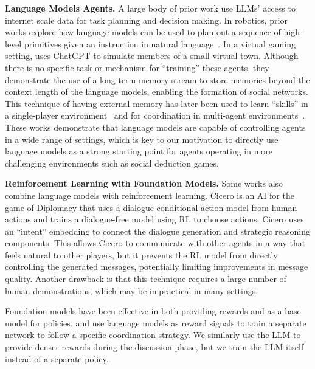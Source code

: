 \noindent \textbf{Language Models Agents.} A large body of prior work use LLMs' access to internet scale data for task planning and decision making. In robotics, prior works explore how language models can be used to plan out a sequence of high-level primitives given an instruction in natural language~\cite{saycan2022arxiv, huang22a, Lin2023}. %
In a virtual gaming setting, \citet{Park2023GenerativeAgents} uses ChatGPT to simulate members of a small virtual town. Although there is no specific task or mechanism for ``training'' these agents, they demonstrate the use of a long-term memory stream to store memories beyond the context length of the language models, enabling the formation of social networks. This technique of having external memory has later been used to learn ``skills'' in a single-player environment~\citep{wang2023voyager} and for coordination in multi-agent environments~\citep{gong2023mindagent}.  These works demonstrate that language models are capable of controlling agents in a wide range of settings, which is key to our motivation to directly use language models as a strong starting point for agents operating in more challenging environments such as social deduction games.

\smallskip

\noindent \textbf{Reinforcement Learning with Foundation Models.}
Some works also combine language models with reinforcement learning. Cicero \citep{doi:10.1126/science.ade9097} is an AI for the game of Diplomacy that uses a dialogue-conditional action model from human actions and trains a dialogue-free model using RL to choose actions. Cicero uses an ``intent'' embedding to connect the dialogue generation and strategic reasoning components. This allows Cicero to communicate with other agents in a way that feels natural to other players, but it prevents the RL model from directly controlling the generated messages, potentially limiting improvements in message quality. Another drawback is that this technique requires a large number of human demonstrations, which may be impractical in many settings.

Foundation models have been effective in both providing rewards and as a base model for policies. \citet{hu2023language} and \citet{kwon2023reward} use language models as reward signals to train a separate network to follow a specific coordination strategy. We similarly use the LLM to provide denser rewards during the discussion phase, but we train the LLM itself instead of a separate policy. 


